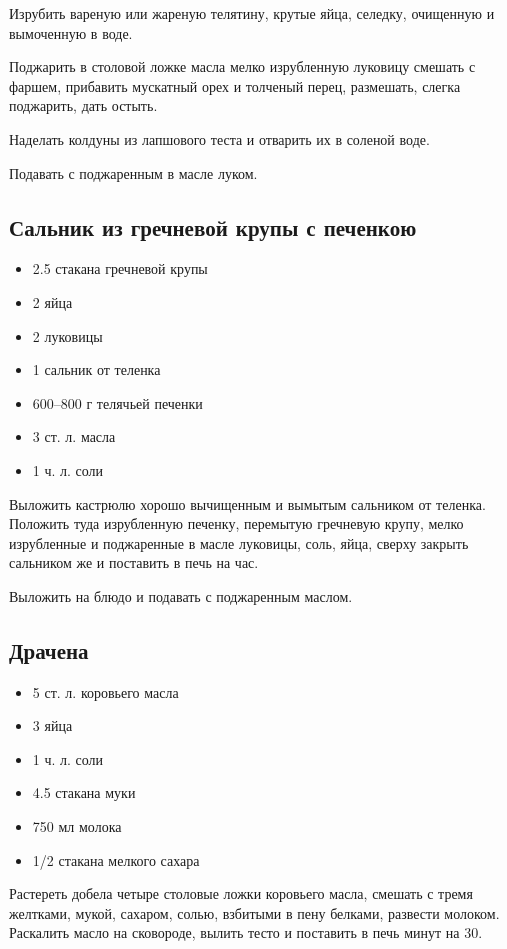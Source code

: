 Изрубить вареную или жареную телятину, крутые яйца, селедку, очищенную и вымоченную в воде.

Поджарить в столовой ложке масла мелко изрубленную луковицу смешать с фаршем, прибавить мускатный орех и толченый перец, размешать, слегка поджарить, дать остыть.

Наделать колдуны из лапшового теста и отварить их в соленой воде.

Подавать с поджаренным в масле луком.

\subsection{Сальник из гречневой крупы с печенкою}

\begin{itemize}
	\item 2.5 стакана гречневой крупы 
    \item 2 яйца 
    \item 2 луковицы
    \item 1 сальник от теленка
    \item 600–800 г телячьей печенки
    \item 3 ст. л. масла
    \item 1 ч. л. соли
\end{itemize}

Выложить кастрюлю хорошо вычищенным и вымытым сальником от теленка. Положить туда изрубленную печенку, перемытую гречневую крупу, мелко изрубленные и поджаренные в масле луковицы, соль, яйца, сверху закрыть сальником же и поставить в печь на час.

Выложить на блюдо и подавать с поджаренным маслом.

\subsection{Драчена}

\begin{itemize}
	\item 5 ст. л. коровьего масла 
    \item 3 яйца 
    \item 1 ч. л. соли
    \item 4.5 стакана муки 
    \item 750 мл молока 
    \item 1/2 стакана мелкого сахара
\end{itemize}

Растереть добела четыре столовые ложки коровьего масла, смешать с тремя желтками, мукой, сахаром, солью, взбитыми в пену белками, развести молоком. Раскалить масло на сковороде, вылить тесто и поставить в печь минут на 30.

